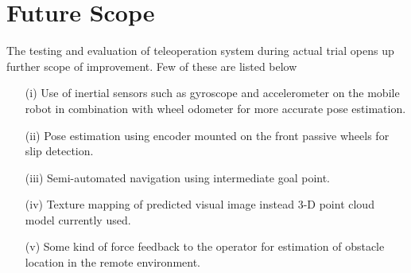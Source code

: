 \section{Future Scope }
The testing and evaluation of teleoperation system during actual trial opens up  further scope of improvement. Few of these are listed below  
\begin{itemize}
	\item [(i)] Use of inertial sensors such as gyroscope and accelerometer  on the mobile robot  in combination with wheel odometer for more accurate  pose estimation.   
	
	\item[(ii)]  Pose estimation using encoder mounted on the front passive wheels for slip detection.
	
	\item[(iii)] Semi-automated navigation using intermediate goal point.  
	
	\item[(iv)] Texture mapping of predicted  visual image instead 3-D point cloud model currently used.
	\item [(v)] Some kind of force feedback to the operator for estimation of obstacle location in the remote environment.


\end{itemize}	
